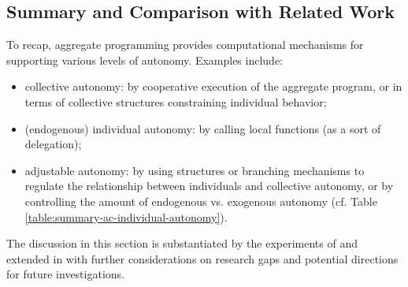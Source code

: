 \documentclass[jsan,article,accept,moreauthors,pdftex]{Definitions/mdpi}
\begin{document}
\begin{paracol}{2}
%
%



\subsection{Summary and Comparison with Related Work}
\label{s:summary-comparison-rw}


To recap, aggregate programming provides computational mechanisms for supporting various levels of autonomy. Examples include:
\begin{itemize}
\item {collective autonomy}: by cooperative execution of the aggregate program, or in terms of collective structures constraining individual behavior;
\item {(endogenous) individual autonomy}: by calling local functions (as a sort of delegation);
\item {adjustable autonomy}: by using structures or branching mechanisms to regulate the relationship between individuals and collective autonomy, or by controlling the amount of endogenous vs. exogenous autonomy  {(cf. Table \ref{table:summary-ac-individual-autonomy})}.
\end{itemize}
%

The discussion in this section is substantiated by the experiments
 of 
 and extended in 
 with further considerations on research gaps
 and potential directions for future investigations.


\end{paracol}
\end{document}

